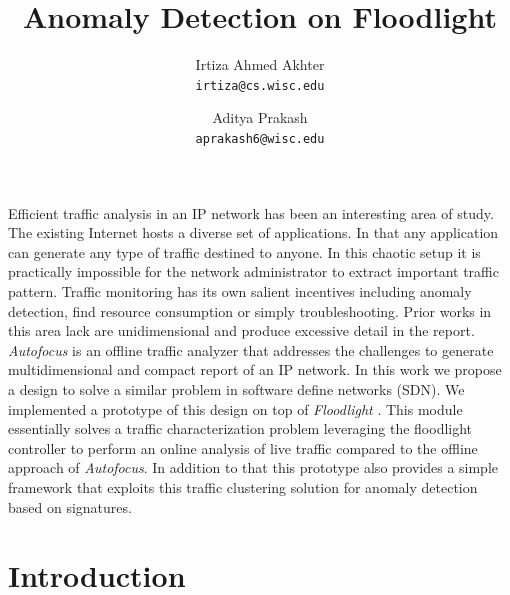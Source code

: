 \documentclass[twocolumn]{article}
\begin{document}
\title{Anomaly Detection on Floodlight}
\author{Irtiza Ahmed Akhter \\ 
		\texttt{irtiza@cs.wisc.edu} 
		\and Aditya Prakash\\
		\texttt{aprakash6@wisc.edu}}

\maketitle

\abstract
Efficient traffic analysis in an IP network has been an interesting area of study. The existing Internet hosts a diverse set of applications. In that any application can generate any type of traffic destined to anyone. In this chaotic setup it is practically impossible for the network administrator to extract important traffic pattern. Traffic monitoring has its own salient incentives including anomaly detection, find resource consumption or simply troubleshooting. Prior works in this area lack are unidimensional and produce excessive detail in the report. \emph{Autofocus}\cite{estan} is an offline traffic analyzer that addresses the challenges to generate multidimensional and compact report of an IP network.  In this work we propose a design to solve a similar problem in software define networks (SDN). We implemented a prototype of this design on top of \emph{Floodlight} \cite{floodlight}. This module essentially solves a traffic characterization problem leveraging the floodlight controller to perform an online analysis of live traffic compared to the offline approach of \emph{Autofocus}. In addition to that this prototype also provides a simple framework that exploits this traffic clustering solution for anomaly detection based on signatures. 



\section{Introduction}
\end{document}
